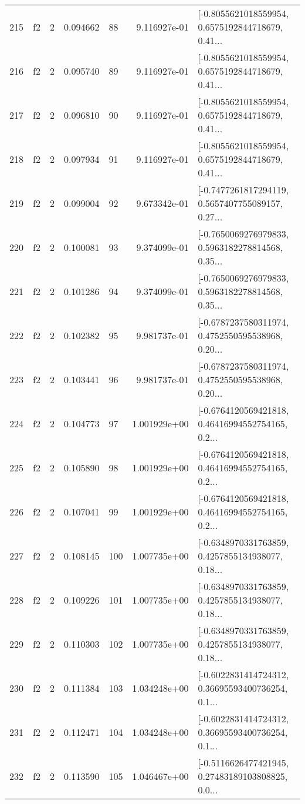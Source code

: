 \begin{tabular}{lllrlrl}
215 &  f2 &   2 &  0.094662 &   88 &  9.116927e-01 &  [-0.8055621018559954, 0.6575192844718679, 0.41... \\
216 &  f2 &   2 &  0.095740 &   89 &  9.116927e-01 &  [-0.8055621018559954, 0.6575192844718679, 0.41... \\
217 &  f2 &   2 &  0.096810 &   90 &  9.116927e-01 &  [-0.8055621018559954, 0.6575192844718679, 0.41... \\
218 &  f2 &   2 &  0.097934 &   91 &  9.116927e-01 &  [-0.8055621018559954, 0.6575192844718679, 0.41... \\
219 &  f2 &   2 &  0.099004 &   92 &  9.673342e-01 &  [-0.7477261817294119, 0.5657407755089157, 0.27... \\
220 &  f2 &   2 &  0.100081 &   93 &  9.374099e-01 &  [-0.7650069276979833, 0.5963182278814568, 0.35... \\
221 &  f2 &   2 &  0.101286 &   94 &  9.374099e-01 &  [-0.7650069276979833, 0.5963182278814568, 0.35... \\
222 &  f2 &   2 &  0.102382 &   95 &  9.981737e-01 &  [-0.6787237580311974, 0.4752550595538968, 0.20... \\
223 &  f2 &   2 &  0.103441 &   96 &  9.981737e-01 &  [-0.6787237580311974, 0.4752550595538968, 0.20... \\
224 &  f2 &   2 &  0.104773 &   97 &  1.001929e+00 &  [-0.6764120569421818, 0.46416994552754165, 0.2... \\
225 &  f2 &   2 &  0.105890 &   98 &  1.001929e+00 &  [-0.6764120569421818, 0.46416994552754165, 0.2... \\
226 &  f2 &   2 &  0.107041 &   99 &  1.001929e+00 &  [-0.6764120569421818, 0.46416994552754165, 0.2... \\
227 &  f2 &   2 &  0.108145 &  100 &  1.007735e+00 &  [-0.6348970331763859, 0.4257855134938077, 0.18... \\
228 &  f2 &   2 &  0.109226 &  101 &  1.007735e+00 &  [-0.6348970331763859, 0.4257855134938077, 0.18... \\
229 &  f2 &   2 &  0.110303 &  102 &  1.007735e+00 &  [-0.6348970331763859, 0.4257855134938077, 0.18... \\
230 &  f2 &   2 &  0.111384 &  103 &  1.034248e+00 &  [-0.6022831414724312, 0.36695593400736254, 0.1... \\
231 &  f2 &   2 &  0.112471 &  104 &  1.034248e+00 &  [-0.6022831414724312, 0.36695593400736254, 0.1... \\
232 &  f2 &   2 &  0.113590 &  105 &  1.046467e+00 &  [-0.5116626477421945, 0.27483189103808825, 0.0... \\

\end{tabular}
